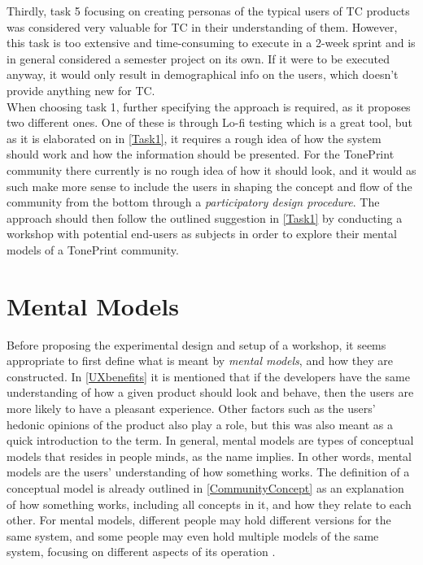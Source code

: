 Thirdly, task 5 focusing on creating personas of the typical users of TC products was considered very valuable for TC in their understanding of them. However, this task is too extensive and time-consuming to execute in a 2-week sprint and is in general considered a semester project on its own. If it were to be executed anyway, it would only result in demographical info on the users, which doesn't provide anything new for TC.\\

\noindent
When choosing task 1, further specifying the approach is required, as it proposes two different ones. One of these is through Lo-fi testing which is a great tool, but as it is elaborated on in \autoref{Task1}, it requires a rough idea of how the system should work and how the information should be presented. For the TonePrint community there currently is no rough idea of how it should look, and it would as such make more sense to include the users in shaping the concept and flow of the community from the bottom through a \textit{participatory design procedure}. The approach should then follow the outlined suggestion in \autoref{Task1} by conducting a workshop with potential end-users as subjects in order to explore their mental models of a TonePrint community. 

\section{Mental Models}
\label{MentalModel}
Before proposing the experimental design and setup of a workshop, it seems appropriate to first define what is meant by \textit{mental models}, and how they are constructed. In \autoref{UXbenefits} it is mentioned that if the developers have the same understanding of how a given product should look and behave, then the users are more likely to have a pleasant experience. Other factors such as the users' hedonic opinions of the product also play a role, but this was also meant as a quick introduction to the term. In general, mental models are types of conceptual models that resides in people minds, as the name implies. In other words, mental models are the users' understanding of how something works. The definition of a conceptual model is already outlined in \autoref{CommunityConcept} as an explanation of how something works, including all concepts in it, and how they relate to each other. For mental models, different people may hold different versions for the same system, and some people may even hold multiple models of the same system, focusing on different aspects of its operation \parencite[][26]{PDF:DonNorman}. \\

